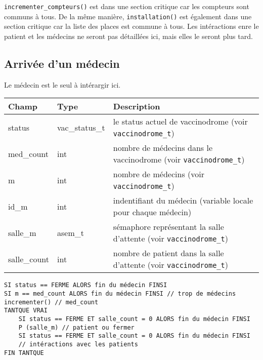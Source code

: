 \documentclass[a4paper]{article}
\begin{document}
    \texttt{incrementer\_compteurs()} est dans une section critique car les compteurs sont communs à tous.
    De la même manière, \texttt{installation()} est également dans une section critique car la liste des places est commune à tous.
    Les intéractions enre le patient et les médecins ne seront pas détaillées ici, mais elles le seront plus tard.
  
\subsection{Arrivée d'un médecin}

Le médecin est le seul à intérargir ici.
\bigskip \newline
\begin{tabularx}{\linewidth}{|l|l|>{\strut}X|}
  \hline%
  Champ & Type & Description \\ \hline%
  status & vac\_status\_t & le status actuel de vaccinodrome (voir \texttt{vaccinodrome\_t}) \\ \hline%
  med\_count & int & nombre de médecins dans le vaccinodrome (voir \texttt{vaccinodrome\_t}) \\ \hline%
  m & int & nombre de médecins (voir \texttt{vaccinodrome\_t}) \\ \hline%
  id\_m & int & indentifiant du médecin (variable locale pour chaque médecin) \\ \hline%
  salle\_m & asem\_t & sémaphore représentant la salle d'attente (voir \texttt{vaccinodrome\_t}) \\ \hline%
  salle\_count & int & nombre de patient dans la salle d'attente (voir \texttt{vaccinodrome\_t}) \\ \hline%
\end{tabularx}
  
\begin{verbatim}
SI status == FERME ALORS fin du médecin FINSI
SI m == med_count ALORS fin du médecin FINSI // trop de médecins
incrementer() // med_count 
TANTQUE VRAI
    SI status == FERME ET salle_count = 0 ALORS fin du médecin FINSI
    P (salle_m) // patient ou fermer
    SI status == FERME ET salle_count = 0 ALORS fin du médecin FINSI
    // intéractions avec les patients
FIN TANTQUE
\end{verbatim}
\end{document}
